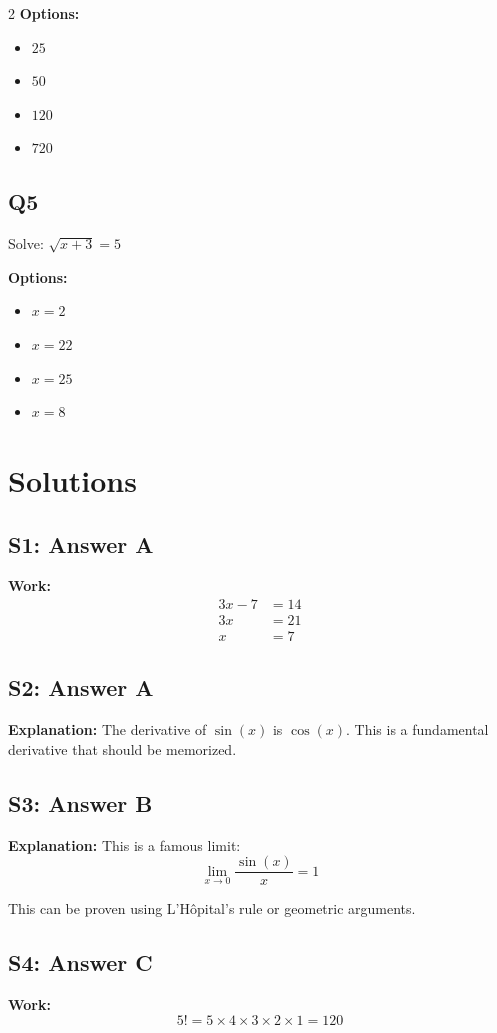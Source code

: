 \documentclass[12pt]{article}
\begin{document}
\begin{multicols}{2}
\textbf{Options:}
\begin{itemize}
    \item[A)] $25$
    \item[B)] $50$
    \item[C)] $120$
    \item[D)] $720$
\end{itemize}

\subsection*{Q5}
Solve: $\sqrt{x + 3} = 5$

\textbf{Options:}
\begin{itemize}
    \item[A)] $x = 2$
    \item[B)] $x = 22$
    \item[C)] $x = 25$
    \item[D)] $x = 8$
\end{itemize}

\columnbreak

\section*{Solutions}

\subsection*{S1: Answer A}
\textbf{Work:}
\begin{align*}
    3x - 7 &= 14 \\
    3x &= 21 \\
    x &= 7
\end{align*}

\subsection*{S2: Answer A}
\textbf{Explanation:}
The derivative of $\sin(x)$ is $\cos(x)$. This is a fundamental derivative that should be memorized.

\subsection*{S3: Answer B}
\textbf{Explanation:}
This is a famous limit:
$$\lim_{x \to 0} \frac{\sin(x)}{x} = 1$$

This can be proven using L'Hôpital's rule or geometric arguments.

\subsection*{S4: Answer C}
\textbf{Work:}
$$5! = 5 \times 4 \times 3 \times 2 \times 1 = 120$$


\end{multicols}
\end{document}
